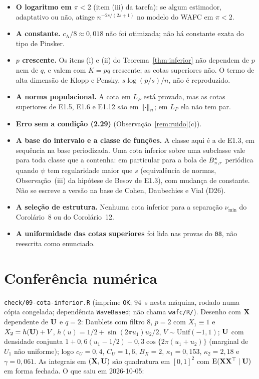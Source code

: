 \documentclass[11pt,a4paper]{article}
\newcommand{\cA}{c_{\mathrm{A}}}
\begin{document}
\begin{itemize}[leftmargin=*, nosep]
  \item \textbf{O logaritmo em $\pi < 2$} (item (iii) da tarefa): se algum
    estimador, adaptativo ou não, atinge $n^{-2s/(2s+1)}$ no modelo do WAFC
    em $\pi < 2$.
  \item \textbf{A constante.} $\cA/8 \approx 0{,}018$ não foi otimizada; não
    há constante exata do tipo de Pinsker.
  \item \textbf{$p$ crescente.} Os itens (i) e (ii) do
    Teorema~\ref{thm:inferior} não dependem de $p$ nem de $q$, e valem com
    $K = pq$ crescente; as cotas superiores não. O termo de alta dimensão de
    Klopp e Pensky, $s\log(p/s)/n$, não é reproduzido.
  \item \textbf{A norma populacional.} A cota em $L_{P}$ está provada, mas as
    cotas superiores de E1.5, E1.6 e E1.12 são em $\left\lVert \cdot \right\rVert_{n}$; em $L_{P}$
    ela não tem par.
  \item \textbf{Erro sem a condição (2.29)} (Observação~\ref{rem:ruido}(c)).
  \item \textbf{A base do intervalo e a classe de funções.} A classe aqui é
    a de E1.3, em sequência na base periodizada. Uma cota inferior sobre uma
    subclasse vale para toda classe que a contenha: em particular para a bola
    de $B^{s}_{\pi,r}$ periódica quando $\psi$ tem regularidade maior que
    $s$ (equivalência de normas, Observação~(iii) da hipótese de Besov de
    E1.3), com mudança de constante. Não se escreve a versão na base de
    Cohen, Daubechies e Vial (D26).
  \item \textbf{A seleção de estrutura.} Nenhuma cota inferior para a
    separação $\nu_{\min}$ do Corolário~8 ou do Corolário~12.
  \item \textbf{A uniformidade das cotas superiores} foi lida nas provas do
    \texttt{08}, não reescrita como enunciado.
\end{itemize}

\section{Conferência numérica}

\texttt{check/09-cota-inferior.R} (imprime \texttt{OK}; $94$~s nesta
máquina, rodado numa cópia congelada; dependência \texttt{WaveBased}; não chama \texttt{wafc/R/}).
Desenho com $\mathbf{X}$ dependente de $\mathbf{U}$ e $q = 2$: Daublets com filtro $8$,
$p = 2$ com $X_{1} \equiv 1$ e $X_{2} = h(\mathbf{U}) + V$, $h(u) = 1/2 +
\sin(2\pi u_{1})u_{2}/2$, $V \sim \mathrm{Unif}(-1,1)$; $\mathbf{U}$ com densidade
conjunta $1 + 0{,}6(u_{1} - 1/2) + 0{,}3\cos\{2\pi(u_{1}+u_{2})\}$ (marginal de
$U_{1}$ não uniforme); logo $c_{U} = 0{,}4$, $C_{U} = 1{,}6$, $B_{X} = 2$,
$\kappa_{1} = 0{,}153$, $\kappa_{2} = 2{,}18$ e $\gamma = 0{,}061$. As integrais
em $(\mathbf{X},\mathbf{U})$ são quadratura em $[0,1]^{2}$ com $\mathrm{E}(\mathbf{X}\mathbf{X}^{\top}\mid\mathbf{U})$ em forma
fechada. O que saiu em 2026-10-05:
\end{document}
